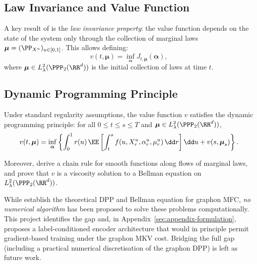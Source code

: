 \documentclass[11pt]{article}
\begin{document}
\subsection{Law Invariance and Value Function}

A key result of \citet{decrescenzo2025mfc} is the \emph{law invariance property}: the value function depends on the state of the system only through the collection of marginal laws $\boldsymbol{\mu} = (\PP_{X^u})_{u \in [0,1]}$. This allows defining:
\begin{equation}\label{eq:nonexch-value}
  v(t, \boldsymbol{\mu}) = \inf_{\boldsymbol{\alpha}} J_{t,\boldsymbol{\mu}}(\boldsymbol{\alpha}),
\end{equation}
where $\boldsymbol{\mu} \in L^2_\lambda(\PPP_2(\RR^d))$ is the initial collection of laws at time $t$.

\subsection{Dynamic Programming Principle}

\begin{theorem}
  Under standard regularity assumptions, the value function $v$ satisfies the dynamic programming principle: for all $0 \le t \le s \le T$ and $\boldsymbol{\mu} \in L^2_\lambda(\PPP_2(\RR^d))$,
  \begin{equation}
    v(t, \boldsymbol{\mu}) = \inf_{\boldsymbol{\alpha}} \left\{ \int_0^1 r(u)\,\EE\left[\int_t^s f\!\left(u, X_r^u, \alpha_r^u, \mu_r^u\right)\dd r\right]\dd u + v(s, \boldsymbol{\mu}_s) \right\}.
  \end{equation}
\end{theorem}

Moreover, \citet{decrescenzo2025mfc} derive a chain rule for smooth functions along flows of marginal laws, and prove that $v$ is a viscosity solution to a Bellman equation on $L^2_\lambda(\PPP_2(\RR^d))$.

\begin{remark}
  While \citet{decrescenzo2025mfc} establish the theoretical DPP and Bellman equation for graphon MFC, \emph{no numerical algorithm} has been proposed to solve these problems computationally. This project identifies the gap and, in Appendix~\ref{sec:appendix-formulation}, proposes a label-conditioned encoder architecture that would in principle permit gradient-based training under the graphon MKV cost. Bridging the full gap (including a practical numerical discretisation of the graphon DPP) is left as future work.
\end{remark}
\end{document}
